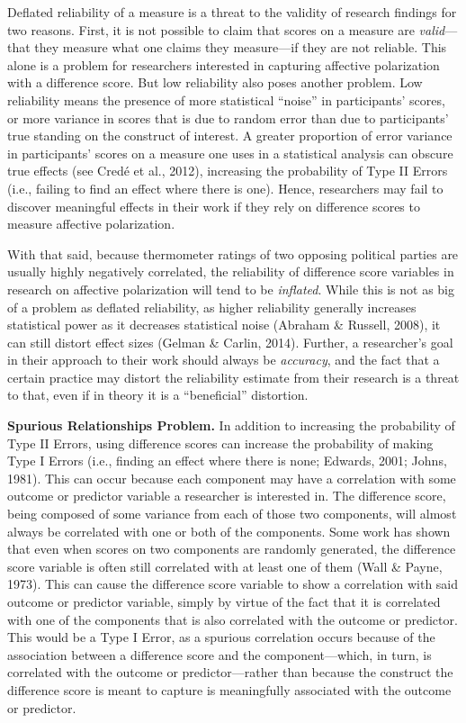 \documentclass[authordate, meta]{jote-new-article}
\begin{document}
	Deflated reliability of a measure is a threat to the validity of research findings for two reasons. First, it is not possible to claim that scores on a measure are \emph{valid}—that they measure what one claims they measure—if they are not reliable. This alone is a problem for researchers interested in capturing affective polarization with a difference score. But low reliability also poses another problem. Low reliability means the presence of more statistical “noise” in participants' scores, or more variance in scores that is due to random error than due to participants' true standing on the construct of interest. A greater proportion of error variance in participants' scores on a measure one uses in a statistical analysis can obscure true effects (see Credé et al., 2012), increasing the probability of Type II Errors (i.e., failing to find an effect where there is one). Hence, researchers may fail to discover meaningful effects in their work if they rely on difference scores to measure affective polarization.



	With that said, because thermometer ratings of two opposing political parties are usually highly negatively correlated, the reliability of difference score variables in research on affective polarization will tend to be \emph{inflated}. While this is not as big of a problem as deflated reliability, as higher reliability generally increases statistical power as it decreases statistical noise (Abraham \& Russell, 2008), it can still distort effect sizes (Gelman \& Carlin, 2014). Further, a researcher's goal in their approach to their work should always be \emph{accuracy}, and the fact that a certain practice may distort the reliability estimate from their research is a threat to that, even if in theory it is a “beneficial” distortion.



	\textbf{Spurious Relationships Problem. }In addition to increasing the probability of Type II Errors, using difference scores can increase the probability of making Type I Errors (i.e., finding an effect where there is none; Edwards, 2001; Johns, 1981). This can occur because each component may have a correlation with some outcome or predictor variable a researcher is interested in. The difference score, being composed of some variance from each of those two components, will almost always be correlated with one or both of the components. Some work has shown that even when scores on two components are randomly generated, the difference score variable is often still correlated with at least one of them (Wall \& Payne, 1973). This can cause the difference score variable to show a correlation with said outcome or predictor variable, simply by virtue of the fact that it is correlated with one of the components that is also correlated with the outcome or predictor. This would be a Type I Error, as a spurious correlation occurs because of the association between a difference score and the component—which, in turn, is correlated with the outcome or predictor—rather than because the construct the difference score is meant to capture is meaningfully associated with the outcome or predictor.
\end{document}
